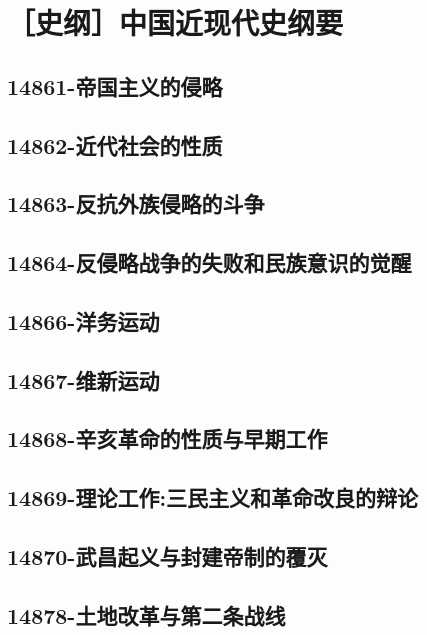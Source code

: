 \section{［史纲］中国近现代史纲要}


\subsection{14861-帝国主义的侵略}

\subsection{14862-近代社会的性质}

\subsection{14863-反抗外族侵略的斗争}

\subsection{14864-反侵略战争的失败和民族意识的觉醒}

\subsection{14866-洋务运动}

\subsection{14867-维新运动}

\subsection{14868-辛亥革命的性质与早期工作}

\subsection{14869-理论工作:三民主义和革命改良的辩论}

\subsection{14870-武昌起义与封建帝制的覆灭}

\subsection{14878-土地改革与第二条战线}

